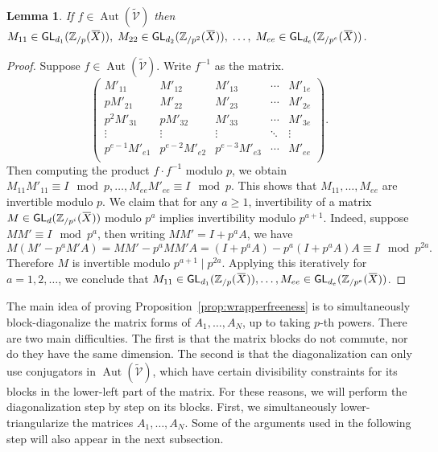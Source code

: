 \documentclass[letterpaper, 11pt, thm-restate]{article}
\numberwithin{equation}{section}
\newcommand{\Zpe}{\mathbb{Z}_{/p^e}}
\newcommand{\Zp}{\mathbb{Z}_{/p}}
\newcommand{\Zpt}{\mathbb{Z}_{/p^2}}
\newcommand{\Zpi}{\mathbb{Z}_{/p^i}}
\newcommand{\GL}{\mathsf{GL}}
\newcommand{\Aut}{\operatorname{Aut}}
\newcommand{\tmV}{\widetilde{\mathcal{V}}}
\newcommand{\oX}{\mkern 1.5mu\overline{\mkern-1.5mu X \mkern-1.5mu}\mkern 1.5mu}
\newtheorem{lem}[thrm]{Lemma}
\theoremstyle{definition}
\theoremstyle{definition}
\theoremstyle{definition}
\begin{document}
\begin{lem}
    If $f \in \Aut(\tmV)$ then $M_{11} \in \GL_{d_1}(\Zp(\oX)),\; M_{22} \in \GL_{d_2}(\Zpt(\oX)),\; \ldots,\; M_{ee} \in \GL_{d_e}(\Zpe(\oX))$.
\end{lem}
\begin{proof}
    Suppose $f \in \Aut(\tmV)$.
    Write $f^{-1}$ as the matrix.
    \[
    \begin{pmatrix}
        M'_{11} & M'_{12} & M'_{13} & \cdots & M'_{1e} \\
        p M'_{21} & M'_{22} & M'_{23} & \cdots & M'_{2e} \\
        p^2 M'_{31} & p M'_{32} & M'_{33} & \cdots & M'_{3e} \\
        \vdots & \vdots & \vdots & \ddots & \vdots \\
        p^{e-1} M'_{e1} & p^{e-2} M'_{e2} & p^{e-3} M'_{e3} & \cdots & M'_{ee} \\
    \end{pmatrix}.
    \]
    Then computing the product $f \cdot f^{-1}$ modulo $p$, we obtain $M_{11} M'_{11} \equiv I \mod p, \ldots, M_{ee} M'_{ee} \equiv I \mod p$.
    This shows that $M_{11}, \ldots, M_{ee}$ are invertible modulo $p$.
    We claim that for any $a \geq 1$, invertibility of a matrix $M \in \GL_d(\Zpi(\oX))$ modulo $p^a$ implies invertibility modulo $p^{a+1}$.
    Indeed, suppose $M M' \equiv I \mod p^a$, then writing $MM' = I + p^a A$, we have
    \[
    M(M' - p^a M' A) = MM' - p^a MM' A = (I + p^a A) - p^a(I + p^a A) A \equiv I \mod p^{2a}.
    \]
    Therefore $M$ is invertible modulo $p^{a+1} \mid p^{2a}$.
    Applying this iteratively for $a = 1, 2, \ldots$, we conclude that $M_{11} \in \GL_{d_1}(\Zp(\oX)), \ldots, M_{ee} \in \GL_{d_e}(\Zpe(\oX))$.
\end{proof}

The main idea of proving Proposition~\ref{prop:wrapperfreeness} is to simultaneously block-diagonalize the matrix forms of $A_1, \ldots, A_N$, up to taking $p$-th powers.
There are two main difficulties.
The first is that the matrix blocks do not commute, nor do they have the same dimension.
The second is that the diagonalization can only use conjugators in $\Aut(\tmV)$, which have certain divisibility constraints for its blocks in the lower-left part of the matrix.
For these reasons, we will perform the diagonalization step by step on its blocks.
First, we simultaneously lower-triangularize the matrices $A_1, \ldots, A_N$.
Some of the arguments used in the following step will also appear in the next subsection.
\end{document}
